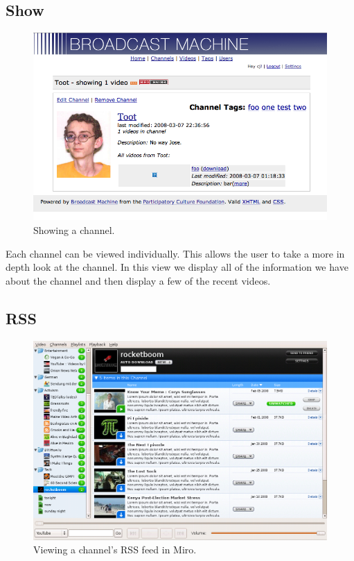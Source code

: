 \documentclass[a4paper,12pt]{report}
\begin{document}
\subsection{Show}
\begin{figure}[h]
\begin{center}
\includegraphics[width=150mm]{./images/channelshow.png}
\end{center}
\caption{Showing a channel.}
\end{figure}

Each channel can be viewed individually.
This allows the user to take a more in depth look at the channel.
In this view we display all of the information we have about the channel and then display a few of the recent videos.

\subsection{RSS}
\begin{figure}[h]
\begin{center}
\includegraphics[width=150mm]{./images/channelrss.png}
\end{center}
\caption{Viewing a channel's RSS feed in Miro.}
\end{figure}
\end{document}
